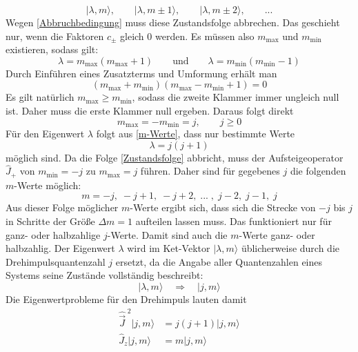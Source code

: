 \documentclass[9pt]{report}
\begin{document}
\begin{equation}
|\lambda,m\rangle,\qquad|\lambda,m\pm 1\rangle,\qquad|\lambda,m\pm 2\rangle,\qquad ...\label{Zustandsfolge}
\end{equation}
Wegen \eqref{Abbruchbedingung} muss diese Zustandsfolge abbrechen. Das geschieht nur, wenn die Faktoren $c_{\pm}$ gleich 0 werden. Es müssen also $m_{\mathrm{max}}$ und $m_{\mathrm{min}}$ existieren, sodass gilt:
\begin{equation}
\lambda=m_{\mathrm{max}}(m_{\mathrm{max}}+1)\qquad\mathrm{und}\qquad\lambda=m_{\mathrm{min}}(m_{\mathrm{min}}-1)\label{m-Werte}
\end{equation}
Durch Einführen eines Zusatzterms und Umformung erhält man
\begin{equation}
(m_{\mathrm{max}}+m_{\mathrm{min}})(m_{\mathrm{max}}-m_{\mathrm{min}}+1)=0
\end{equation}
Es gilt natürlich $m_{\mathrm{max}}\geq m_{\mathrm{min}}$, sodass die zweite Klammer immer ungleich null ist. Daher muss die erste Klammer null ergeben. Daraus folgt direkt
\begin{equation}
m_{\mathrm{max}}=-m_{\mathrm{min}}=j,\qquad j\geq 0
\end{equation}
Für den Eigenwert $\lambda$ folgt aus \eqref{m-Werte}, dass nur bestimmte Werte
\begin{equation}
\lambda = j(j+1)
\end{equation}
möglich sind. Da die Folge \eqref{Zustandsfolge} abbricht, muss der Aufsteigeoperator $\hat{J}_{+}$ von $m_{\mathrm{min}}=-j$ zu $m_{\mathrm{max}}=j$ führen. Daher sind für gegebenes $j$ die folgenden $m$-Werte möglich:
\begin{equation}
m=-j,\;-j+1,\;-j+2,\;...\;,\;j-2,\;j-1,\;j\label{Drehimpulsquantenzahlen}
\end{equation}
Aus dieser Folge möglicher $m$-Werte ergibt sich, dass sich die Strecke von $-j$ bis $j$ in Schritte der Größe $\Delta m=1$ aufteilen lassen muss. Das funktioniert nur für ganz- oder halbzahlige $j$-Werte. Damit sind auch die $m$-Werte ganz- oder halbzahlig. Der Eigenwert $\lambda$ wird im Ket-Vektor $|\lambda,m\rangle$ üblicherweise durch die Drehimpulsquantenzahl $j$ ersetzt, da die Angabe aller Quantenzahlen eines Systems seine Zustände vollständig beschreibt:
\begin{equation}
|\lambda,m\rangle\quad\Rightarrow\quad|j,m\rangle
\end{equation}
Die Eigenwertprobleme für den Drehimpuls lauten damit
\begin{align}
\hat{\vec{J}}^{\;2}|j,m\rangle &= j(j+1)|j,m\rangle\label{Eigenwertergebnis 1}\\
\hat{J}_{z}|j,m\rangle &= m|j,m\rangle\label{Eigenwertergebnis 2}
\end{align}
\end{document}
